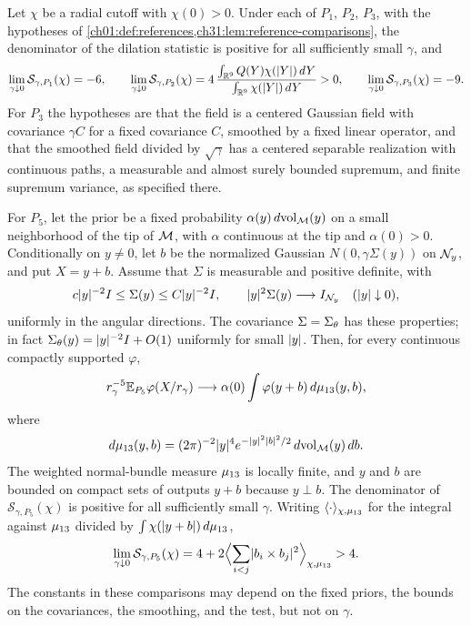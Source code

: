 \begin{theorem}\label{ch32:thm:corrected-reference-ward}
Let $\chi$ be a radial cutoff with $\chi(0)>0$. Under each of $P_1$, $P_2$, $P_3$, with the hypotheses of \cref{ch01:def:references,ch31:lem:reference-comparisons}, the denominator of the dilation statistic is positive for all sufficiently small $\gamma$, and
\[
 \lim_{\gamma\downarrow0}\mathcal S_{\gamma,P_1}(\chi)=-6,\qquad
 \lim_{\gamma\downarrow0}\mathcal S_{\gamma,P_2}(\chi)=4\,\frac{\int_{\mathbb R^9}Q(Y)\chi(\lvert Y\rvert)\,dY}{\int_{\mathbb R^9}\chi(\lvert Y\rvert)\,dY}>0,\qquad
 \lim_{\gamma\downarrow0}\mathcal S_{\gamma,P_3}(\chi)=-9.
\]
For $P_3$ the hypotheses are that the field is a centered Gaussian field with covariance $\gamma C$ for a fixed covariance $C$, smoothed by a fixed linear operator, and that the smoothed field divided by $\sqrt\gamma$ has a centered separable realization with continuous paths, a measurable and almost surely bounded supremum, and finite supremum variance, as specified there.

For $P_5$, let the prior be a fixed probability $\alpha(y)\,d\mathrm{vol}_{\mathcal M}(y)$ on a small neighborhood of the tip of $\mathcal M$, with $\alpha$ continuous at the tip and $\alpha(0)>0$. Conditionally on $y\ne0$, let $b$ be the normalized Gaussian $N(0,\gamma\Sigma(y))$ on $\mathcal N_{y}$, and put $X=y+b$. Assume that $\Sigma$ is measurable and positive definite, with
\[
 c\lvert y\rvert^{-2}I\le\Sigma(y)\le C\lvert y\rvert^{-2}I,\qquad\lvert y\rvert^2\Sigma(y)\longrightarrow I_{\mathcal N_{y}}\quad(\lvert y\rvert\downarrow0),
\]
uniformly in the angular directions. The covariance $\Sigma=\Sigma_\theta$ has these properties; in fact $\Sigma_\theta(y)=\lvert y\rvert^{-2}I+O(1)$ uniformly for small $\lvert y\rvert$. Then, for every continuous compactly supported $\varphi$,
\[
 r_\gamma^{-5}\mathbb E_{P_5}\varphi(X/r_\gamma)\longrightarrow\alpha(0)\int\varphi(y+b)\,d\mu_{13}(y,b),
\]
where
\[
 d\mu_{13}(y,b)=(2\pi)^{-2}\lvert y\rvert^4e^{-\lvert y\rvert^2\lvert b\rvert^2/2}\,d\mathrm{vol}_{\mathcal M}(y)\,db.
\]
The weighted normal-bundle measure $\mu_{13}$ is locally finite, and $y$ and $b$ are bounded on compact sets of outputs $y+b$ because $y\perp b$. The denominator of $\mathcal S_{\gamma,P_5}(\chi)$ is positive for all sufficiently small $\gamma$. Writing $\langle\cdot\rangle_{\chi,\mu_{13}}$ for the integral against $\mu_{13}$ divided by $\int\chi(\lvert y+b\rvert)\,d\mu_{13}$,
\[
 \lim_{\gamma\downarrow0}\mathcal S_{\gamma,P_5}(\chi)=4+2\Bigl\langle\sum_{i<j}\lvert b_i\times b_j\rvert^2\Bigr\rangle_{\chi,\mu_{13}}>4.
\]
The constants in these comparisons may depend on the fixed priors, the bounds on the covariances, the smoothing, and the test, but not on $\gamma$.
\end{theorem}

